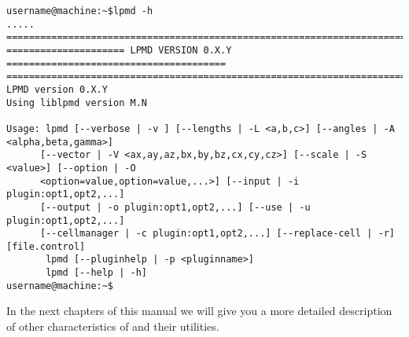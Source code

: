 \begin{verbatim}
username@machine:~$lpmd -h
.....
================================================================================
===================== LPMD VERSION 0.X.Y =======================================
================================================================================
LPMD version 0.X.Y
Using liblpmd version M.N

Usage: lpmd [--verbose | -v ] [--lengths | -L <a,b,c>] [--angles | -A <alpha,beta,gamma>]
      [--vector | -V <ax,ay,az,bx,by,bz,cx,cy,cz>] [--scale | -S <value>] [--option | -O
      <option=value,option=value,...>] [--input | -i plugin:opt1,opt2,...]  
      [--output | -o plugin:opt1,opt2,...] [--use | -u plugin:opt1,opt2,...] 
      [--cellmanager | -c plugin:opt1,opt2,...] [--replace-cell | -r] [file.control]
       lpmd [--pluginhelp | -p <pluginname>]
       lpmd [--help | -h]
username@machine:~$ 
\end{verbatim}

In the next chapters of this manual we will give you a more detailed description
of other characteristics of {\lpmd} and their utilities.

